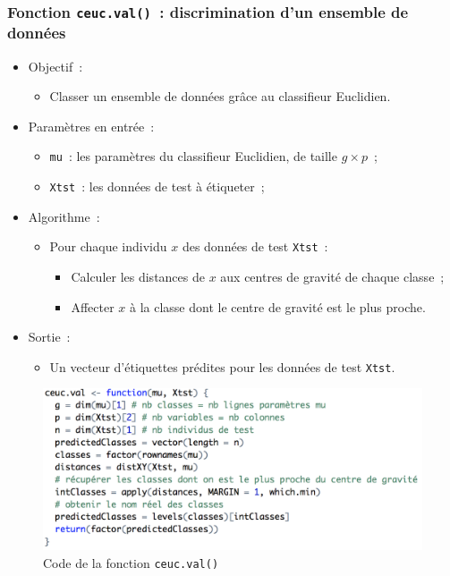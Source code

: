 \documentclass[a4paper,10pt]{report}
\begin{document}
\subsubsection{Fonction \texttt{ceuc.val()}~: discrimination d'un ensemble de données}

\begin{itemize}
	\item Objectif~:
	\begin{itemize}
		\item Classer un ensemble de données grâce au classifieur Euclidien.
	\end{itemize}
	
	\item Paramètres en entrée~:
	\begin{itemize}
		\item \texttt{mu}~: les paramètres du classifieur Euclidien, de taille $g \times p$~;
		\item \texttt{Xtst}~: les données de test à étiqueter~;
	\end{itemize}
	
	\item Algorithme~:
	\begin{itemize}
		\item Pour chaque individu $x$ des données de test \texttt{Xtst}~:
		\begin{itemize}
			\item Calculer les distances de $x$ aux centres de gravité de chaque classe~;
			\item Affecter $x$ à la classe dont le centre de gravité est le plus proche.
		\end{itemize}
	\end{itemize}
	\item Sortie~:
	\begin{itemize}
		\item Un vecteur d'étiquettes prédites pour les données de test \texttt{Xtst}.
	\end{itemize}
\end{itemize}

\begin{figure}[H]
	\centering
	\captionsetup{justification=centering, margin=4cm}
	\includegraphics[width=.6\linewidth]{img/1-1-1-ceuc-val-code}
	\caption{\small Code de la fonction \texttt{ceuc.val()}}	
	\label{fig:1-1-1-ceuc-val-code}%
\end{figure}
\end{document}
